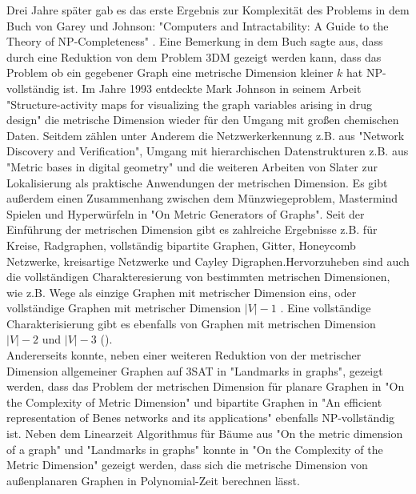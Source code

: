 Drei Jahre später gab es das erste Ergebnis zur Komplexität des Problems in dem Buch von Garey und Johnson: "Computers and Intractability: A Guide to the Theory of NP-Completeness" \cite{book}. Eine Bemerkung in dem Buch sagte aus, dass durch eine Reduktion von dem Problem 3DM gezeigt werden kann, dass das Problem ob ein gegebener Graph eine metrische Dimension kleiner $k$ hat NP-vollständig ist. Im Jahre 1993 entdeckte Mark Johnson in seinem Arbeit "Structure-activity maps for visualizing the graph variables arising in
drug design"\cite{drug} die metrische Dimension wieder für den Umgang mit großen chemischen Daten. Seitdem zählen unter Anderem die Netzwerkerkennung z.B. aus "Network Discovery and Verification"\cite{netzwerk}, Umgang mit hierarchischen Datenstrukturen z.B. aus "Metric bases in digital geometry"\cite{hier} und die weiteren Arbeiten von Slater zur Lokalisierung als praktische Anwendungen der metrischen Dimension. Es gibt außerdem einen Zusammenhang zwischen dem Münzwiegeproblem, Mastermind Spielen und Hyperwürfeln in "On Metric Generators of Graphs"\cite{tannier}.\newpage
Seit der Einführung der metrischen Dimension gibt es zahlreiche Ergebnisse z.B. für Kreise\cite{landmarks}, Radgraphen\cite{wheel}, vollständig bipartite Graphen\cite{reso}, Gitter\cite{landmarks}, Honeycomb Netzwerke\cite{honey}, kreisartige Netzwerke\cite{circulant} und Cayley Digraphen\cite{cayley}.\vspace{-1mm}\newline\newline Hervorzuheben sind auch die vollständigen Charakteresierung von bestimmten metrischen Dimensionen, wie z.B. Wege als einzige Graphen mit metrischer Dimension eins\cite{landmarks}, oder vollständige Graphen mit metrischer Dimension $|V|-1$ \cite{reso}. 
Eine vollständige Charakterisierung gibt es ebenfalls von Graphen mit metrischen Dimension $|V|-2$ \cite{reso} und $|V|-3$ (\cite{n-31,n-32}).\\
Andererseits konnte, neben einer weiteren Reduktion von der metrischer Dimension allgemeiner Graphen auf 3SAT in "Landmarks in graphs"\cite{landmarks}, gezeigt werden, dass das Problem der metrischen Dimension für planare Graphen in "On the Complexity of Metric Dimension"\cite{aussenplanar} und bipartite Graphen in "An efficient representation of Benes networks and its applications"\cite{bipartitnp} ebenfalls NP-vollständig ist. 
Neben dem Linearzeit Algorithmus für Bäume aus "On the metric dimension of a graph"\cite{harary} und "Landmarks in graphs" \cite{landmarks} konnte in "On the Complexity of the Metric Dimension"\cite{aussenplanar} gezeigt werden, dass sich die metrische Dimension von außenplanaren Graphen in Polynomial-Zeit berechnen lässt.\vspace{-1mm}\newline\newline
